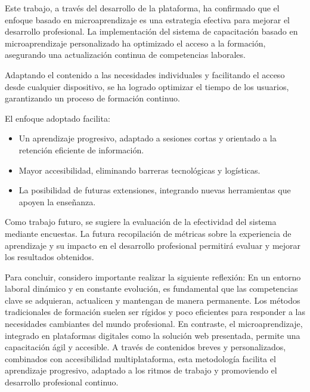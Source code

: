 

Este trabajo, a través del desarrollo de la plataforma, ha confirmado que el
enfoque basado en microaprendizaje es una estrategia efectiva para mejorar el
desarrollo profesional. La implementación del sistema de capacitación basado en
microaprendizaje personalizado ha optimizado el acceso a la formación,
asegurando una actualización continua de competencias laborales.

Adaptando el contenido a las necesidades individuales y facilitando el acceso
desde cualquier dispositivo, se ha logrado optimizar el tiempo de los usuarios,
garantizando un proceso de formación continuo.

El enfoque adoptado facilita:
\begin{itemize}
    \item Un aprendizaje progresivo, adaptado a sesiones cortas y orientado a la
    retención eficiente de información.
    \item Mayor accesibilidad, eliminando barreras tecnológicas y logísticas.
    \item La posibilidad de futuras extensiones, integrando nuevas herramientas
    que apoyen la enseñanza.
\end{itemize}

Como trabajo futuro, se sugiere la evaluación de la efectividad del sistema
mediante encuestas. La futura recopilación de métricas sobre la experiencia de
aprendizaje y su impacto en el desarrollo profesional permitirá evaluar y
mejorar los resultados obtenidos.

Para concluir, considero importante realizar la siguiente reflexión: En un
entorno laboral dinámico y en constante evolución, es fundamental que las
competencias clave se adquieran, actualicen y mantengan de manera permanente.
Los métodos tradicionales de formación suelen ser rígidos y poco eficientes para
responder a las necesidades cambiantes del mundo profesional. En contraste, el
microaprendizaje, integrado en plataformas digitales como la solución web
presentada, permite una capacitación ágil y accesible. A través de contenidos
breves y personalizados, combinados con accesibilidad multiplataforma, esta
metodología facilita el aprendizaje progresivo, adaptado a los ritmos de trabajo
y promoviendo el desarrollo profesional continuo.




